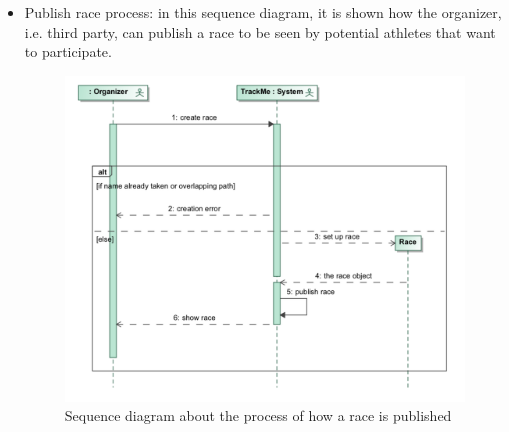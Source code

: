 \begin{itemize}
\item Publish race process: in this sequence diagram, it is shown how the organizer, i.e. third party, can publish a race to be seen by potential athletes that want to participate.
\begin{figure}[H]
\includegraphics[width=\linewidth]{Images/racesequence}
\caption{Sequence diagram about the process of how a race is published}
\label{fig:sequencediagram3}
\end{figure}

\end{itemize}
